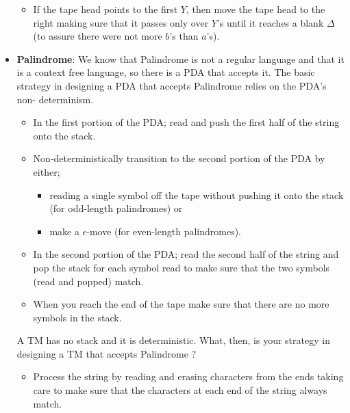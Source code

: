 \documentclass{report}
\begin{document}
\begin{itemize}
\begin{itemize}
                \item If the tape head points to the first $Y$, then move the tape head to the right making sure that it passes only over $Y$’s until it reaches a blank $\Delta$ (to assure there were not more $b$’s than $a$’s).
            \end{itemize}
            \bigbreak \noindent 
            \begin{figure}[ht]
                \centering
                \label{fig:t2}
            \end{figure}
            \pagebreak 
        \item \textbf{Palindrome}: We know that Palindrome is not a regular language and that it is a context free language, so there is a PDA that accepts it. The basic strategy in designing a PDA that accepts Palindrome relies on the PDA’s non- determinism.
            \begin{itemize}
                \item In the first portion of the PDA; read and push the first half of the string onto the stack.
                \item Non-deterministically transition to the second portion of the PDA by either;
                    \begin{itemize}
                        \item reading a single symbol off the tape without pushing it onto the stack (for odd-length palindromes) or
                        \item make a $\epsilon$-move (for even-length palindromes).
                    \end{itemize}
                \item In the second portion of the PDA; read the second half of the string and pop the stack for each symbol read to make sure that the two symbols (read and popped) match.
                \item When you reach the end of the tape make sure that there are no more symbols in the stack.
            \end{itemize}
            \bigbreak \noindent 
            A TM has no stack and it is deterministic. What, then, is your strategy in designing a TM that accepts Palindrome ?
            \begin{itemize}
                \item Process the string by reading and erasing characters from the ends taking care to make sure that the characters at each end of the string always match.

\end{itemize}
\end{itemize}
\end{document}
